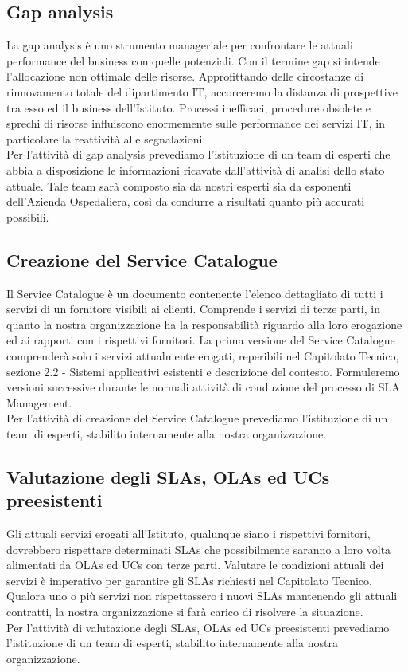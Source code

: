 \subsection{Gap analysis}

La gap analysis è uno strumento manageriale per confrontare le attuali performance del business con quelle potenziali. Con il termine gap si intende l'allocazione non ottimale delle risorse. Approfittando delle circostanze di rinnovamento totale del dipartimento IT, accorceremo la distanza di prospettive tra esso ed il business dell'Istituto. Processi inefficaci, procedure obsolete e sprechi di risorse influiscono enormemente sulle performance dei servizi IT, in particolare la reattività alle segnalazioni.
\\
Per l'attività di gap analysis prevediamo l'istituzione di un team di esperti che abbia a disposizione le informazioni ricavate dall'attività di analisi dello stato attuale. Tale team sarà composto sia da nostri esperti sia da esponenti dell'Azienda Ospedaliera, così da condurre a risultati quanto più accurati possibili.

\subsection{Creazione del Service Catalogue}

Il Service Catalogue è un documento contenente l'elenco dettagliato di tutti i servizi di un fornitore visibili ai clienti. Comprende i servizi di terze parti, in quanto la nostra organizzazione ha la responsabilità riguardo alla loro erogazione ed ai rapporti con i rispettivi fornitori. La prima versione del Service Catalogue comprenderà solo i servizi attualmente erogati, reperibili nel Capitolato Tecnico, sezione 2.2 - Sistemi applicativi esistenti e descrizione del contesto. Formuleremo versioni successive durante le normali attività di conduzione del processo di SLA Management.
\\
Per l'attività di creazione del Service Catalogue prevediamo l'istituzione di un team di esperti, stabilito internamente alla nostra organizzazione.

\subsection{Valutazione degli SLAs, OLAs ed UCs preesistenti}

Gli attuali servizi erogati all'Istituto, qualunque siano i rispettivi fornitori, dovrebbero rispettare determinati SLAs che possibilmente saranno a loro volta alimentati da OLAs ed UCs con terze parti. Valutare le condizioni attuali dei servizi è imperativo per garantire gli SLAs richiesti nel Capitolato Tecnico. Qualora uno o più servizi non rispettassero i nuovi SLAs mantenendo gli attuali contratti, la nostra organizzazione si farà carico di risolvere la situazione.
\\
Per l'attività di valutazione degli SLAs, OLAs ed UCs preesistenti prevediamo l'istituzione di un team di esperti, stabilito internamente alla nostra organizzazione.

